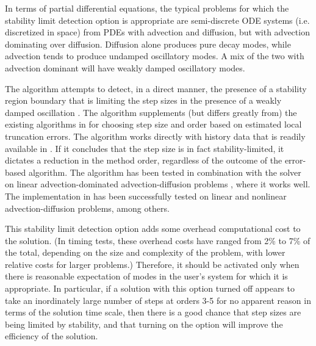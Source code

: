 In terms of partial differential equations, the typical problems for
which the stability limit detection option is appropriate are
semi-discrete ODE systems (i.e. discretized in space) from PDEs with
advection and diffusion, but with advection dominating over diffusion.
Diffusion alone produces pure decay modes, while advection tends to
produce undamped oscillatory modes.  A mix of the two with advection
dominant will have weakly damped oscillatory modes.

The {\stald} algorithm attempts to detect, in a direct
manner, the presence of a stability region boundary that is limiting
the step sizes in the presence of a weakly damped oscillation \cite{Hi92}.
The algorithm supplements (but differs greatly from) the existing
algorithms in {\cvode} for choosing step size and order based on
estimated local truncation errors.  The {\stald} algorithm works directly
with history data that is readily available in {\cvode}.  If it concludes
that the step size is in fact stability-limited, it dictates a
reduction in the method order, regardless of the outcome of the
error-based algorithm.  The {\stald} algorithm has been tested in
combination with the {\vode} solver on linear advection-dominated
advection-diffusion problems \cite{Hi95}, where it works well.  The
implementation in {\cvode} has been successfully tested on linear 
and nonlinear advection-diffusion problems, among others.

This stability limit detection option adds some overhead computational
cost to the {\cvode} solution.  (In timing tests, these overhead costs
have ranged from 2\% to 7\% of the total, depending on the size and
complexity of the problem, with lower relative costs for larger
problems.)  Therefore, it should be activated only when there is
reasonable expectation of modes in the user's system for which it is
appropriate.  In particular, if a {\cvode} solution with this option
turned off appears to take an inordinately large number of steps at
orders 3-5 for no apparent reason in terms of the solution time scale,
then there is a good chance that step sizes are being limited by
stability, and that turning on the option will improve the efficiency
of the solution. 

